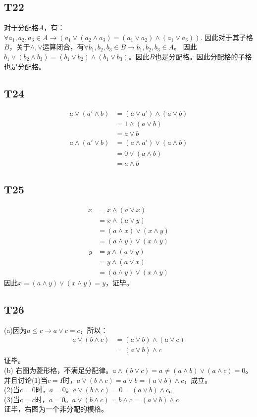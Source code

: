 \documentclass{article}
\begin{document}
\subsection{T22}
对于分配格$A$，有：$\forall a_1, a_2, a_3 \in A \rightarrow (a_1 \lor (a_2 \land a_3) = (a_1 \lor a_2) \land (a_1 \lor a_3))$.
因此对于其子格$B$，关于$\land,\lor$运算闭合，有$\forall b_1, b_2, b_3 \in B \rightarrow b_1, b_2, b_3 \in A$。
因此$b_1 \lor (b_2 \land b_3) = (b_1 \lor b_2) \land (b_1 \lor b_3)$。因此$B$也是分配格。因此分配格的子格也是分配格。
\subsection{T24}
\begin{align*}
    a \lor (a' \land b) &= (a \lor a') \land (a \lor b)\\
    &= 1 \land (a \lor b)\\
    &= a \lor b
\end{align*}
\begin{align*}
    a \land (a' \lor b) &= (a \land a') \lor (a \land b)\\
    &= 0 \lor (a \land b)\\
    &= a \land b
\end{align*}
\subsection{T25}
\begin{align*}
    x &= x \land (a \lor x)\\
    &= x \land (a \lor y)\\
    &= (a \land x) \lor (x \land y)\\
    &= (a \land y) \lor (x \land y)
\end{align*}
\begin{align*}
    y &= y \land (a \lor y)\\
    &= y \land (a \lor x)\\
    &= (a \land y) \lor (x \land y)
\end{align*}
因此$x = (a \land y) \lor (x \land y) = y$，证毕。
\subsection{T26}
(a)因为$a \leq c \rightarrow a \lor c = c$，所以：
\begin{align*}
    a \lor (b \land c) &= (a \lor b) \land (a \lor c)\\
    &= (a \lor b) \land c
\end{align*}证毕。\\
(b) 右图为菱形格，不满足分配律。$a \land (b \lor c) = a \neq (a \land b) \lor (a \land c) = 0$。
并且讨论(1)当$c = I$时，$a \lor (b \land c) = a \lor b = (a \lor b) \land c$，成立。\\
(2)当$c = 0$时，$a = 0$。$a \lor (b \land c) = 0 = (a \lor b) \land c$。\\
(3)当$c = c$时，$a = 0$。$a \lor (b \land c) = b \land c = (a \lor b) \land c$\\
证毕，右图为一个非分配的模格。 
\end{document}
